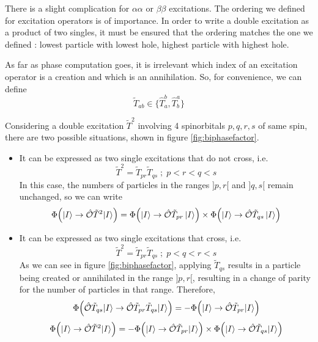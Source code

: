 \documentclass[./thesis.tex]{subfiles}
\begin{document}
There is a slight complication for $\alpha \alpha$ or $\beta \beta$ excitations. The ordering we defined for excitation operators is of importance. In order to write a double excitation as a product of two singles, it must be ensured that the ordering matches the one we defined : lowest particle with lowest hole, highest particle with highest hole.

As far as phase computation goes, it is irrelevant which index of an excitation operator is a creation and which is an annihilation. So, for convenience, we can define
\begin{equation}
\tilde T_{ab} \in \{\hat T_a^b, \hat T_b^a \}
\end{equation}


Considering a double excitation $\tilde T^2$ involving 4 spinorbitals $p,q,r,s$ of same spin, there are two possible situations, shown in figure \ref{fig:biphasefactor}. 

\begin{itemize}
\item
It can be expressed as two single excitations that do not cross, i.e.
\begin{equation}
\tilde T^2=\tilde T_{pr} \tilde T_{qs} \; ; \; p<r<q<s
\end{equation}
In this case, the numbers of particles in the ranges $]p, r[$ and $]q, s[$ remain unchanged, so we can write
\begin{equation}
{\Phi \qty({\ket{I}}\rightarrow {\hat{\mathcal{O}}}\tilde T^2 {\ket{I}})} =
{\Phi \qty({\ket{I}} \rightarrow {\hat{\mathcal{O}}} \tilde T_{pr} \ket I)} \times
{\Phi \qty({\ket{I}}\rightarrow {\hat{\mathcal{O}}}\tilde T_{qs} \ket I)}
\end{equation}

\item
It can be expressed as two single excitations that cross, i.e.
\begin{equation}
\tilde T^2=\tilde T_{pr} \tilde T_{qs} \; ; \; p<q<r<s
\end{equation}
As we can see in figure \ref{fig:biphasefactor}, applying  $\tilde T_{qs}$ results in a particle being created or annihilated in the range $]p,r[$, resulting in a change of parity for the number of particles in that range. Therefore,
\begin{equation}
{\Phi \qty({\hat{\mathcal{O}}}\tilde T_{qs} {\ket{I}}\rightarrow {\hat{\mathcal{O}}}\tilde T_{pr} \tilde T_{qs} {\ket{I}})} = -{\Phi \qty({\ket{I}} \rightarrow {\hat{\mathcal{O}}} \tilde T_{pr} {\ket{I}})}
\end{equation}
\begin{equation}
{\Phi \qty({\ket{I}}\rightarrow {\hat{\mathcal{O}}}\tilde T^2 {\ket{I}})} = -{\Phi \qty({\ket{I}} \rightarrow {\hat{\mathcal{O}}} \tilde T_{pr} {\ket{I}})} \times {\Phi \qty({\ket{I}}\rightarrow {\hat{\mathcal{O}}}\tilde T_{ qs} {\ket{I}})} 
\end{equation}

\end{itemize}
\end{document}
